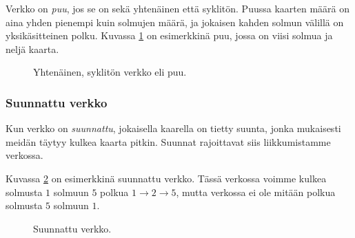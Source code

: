 Verkko on \emph{puu}, jos se on sekä yhtenäinen
että syklitön.
Puussa kaarten määrä on aina yhden pienempi
kuin solmujen määrä, ja jokaisen kahden solmun
välillä on yksikäsitteinen polku.
Kuvassa \ref{fig:verpuu} on esimerkkinä puu,
jossa on viisi solmua ja neljä kaarta.

\begin{figure}
\center
\begin{center}
\end{center}
\caption{Yhtenäinen, syklitön verkko eli puu.}
\label{fig:verpuu}
\end{figure}

\subsubsection{Suunnattu verkko}

Kun verkko on \emph{suunnattu},
jokaisella kaarella on tietty suunta,
jonka mukaisesti meidän täytyy kulkea kaarta pitkin.
Suunnat rajoittavat siis liikkumistamme verkossa.

Kuvassa \ref{fig:versuu} on esimerkkinä
suunnattu verkko.
Tässä verkossa voimme kulkea solmusta $1$ solmuun $5$
polkua $1 \rightarrow 2 \rightarrow 5$,
mutta verkossa ei ole mitään polkua solmusta $5$ solmuun $1$.

\begin{figure}
\center
\begin{center}
\end{center}
\caption{Suunnattu verkko.}
\label{fig:versuu}
\end{figure}

